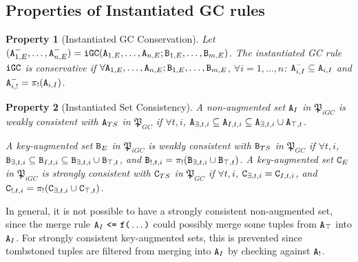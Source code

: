 \documentclass{article}
\numberwithin{equation}{section}
\newtheorem{property}{Property}[section]
\renewcommand{\tt}[1]{\ifmmode\text{\texttt{#1}}\else\texttt{#1}\fi}
\begin{document}
\subsection{Properties of Instantiated GC rules}
\begin{property}[Instantiated GC Conservation]\label{property:instantiated_gc_conservative}
Let $(\tt{A}_{1,E}^-, \dots, \tt{A}_{n,E}^-) = \tt{iGC}(\tt{A}_{1,E}, \dots, \tt{A}_{n,E}; \tt{B}_{1,E}, \dots, \tt{B}_{m,E})$.
The instantiated GC rule $\tt{iGC}$ is \emph{conservative} if $\forall \tt{A}_{1,E}, \dots, \tt{A}_{n,E}; \tt{B}_{1,E}, \dots, \tt{B}_{m,E}$, $\forall i=1,\dots,n$: $\tt{A}_{i,I}^- \subseteq \tt{A}_{i,I}$ and $\tt{A}_{i,!}^- = \pi_!(\tt{A}_{i,I})$.
\end{property}

\begin{property}[Instantiated Set Consistency]
A non-augmented set $\tt{A}_I$ in $\mathfrak{P}_{iGC}$ is \emph{weakly consistent} with $\tt{A}_{TS}$ in $\mathfrak{P}_{GC}$ if $\forall t, i$, $\tt{A}_{\exists,t,i} \subseteq \tt{A}_{I,t,i} \subseteq \tt{A}_{\exists,t,i} \cup \tt{A}_{\top,t}$.

A key-augmented set $\tt{B}_E$ in $\mathfrak{P}_{iGC}$ is \emph{weakly consistent} with $\tt{B}_{TS}$ in $\mathfrak{P}_{GC}$ if $\forall t, i$, $\tt{B}_{\exists,t,i} \subseteq \tt{B}_{I,t,i} \subseteq \tt{B}_{\exists,t,i} \cup \tt{B}_{\top,t}$, and $\tt{B}_{!,t,i} = \pi_!(\tt{B}_{\exists,t,i} \cup \tt{B}_{\top,t})$.
A key-augmented set $\tt{C}_E$ in $\mathfrak{P}_{iGC}$ is \emph{strongly consistent} with $\tt{C}_{TS}$ in $\mathfrak{P}_{GC}$ if $\forall t, i$, $\tt{C}_{\exists,t,i} = \tt{C}_{I,t,i}$, and $\tt{C}_{!,t,i} = \pi_!(\tt{C}_{\exists,t,i} \cup \tt{C}_{\top,t})$.
\end{property}

In general, it is not possible to have a strongly consistent non-augmented set, since the merge rule $\tt{A}_I ~\tt{<=}~ \tt{f}\tt{(}\dots\tt{)}$ could possibly merge some tuples from $\tt{A}_\top$ into $\tt{A}_I$.
For strongly consistent key-augmented sets, this is prevented since tombstoned tuples are filtered from merging into $\tt{A}_I$ by checking against $\tt{A}_!$.
\end{document}
